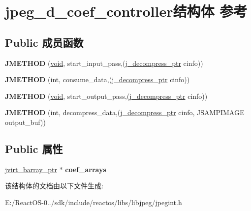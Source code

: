 \hypertarget{structjpeg__d__coef__controller}{}\section{jpeg\+\_\+d\+\_\+coef\+\_\+controller结构体 参考}
\label{structjpeg__d__coef__controller}
\subsection*{Public 成员函数}
\begin{DoxyCompactItemize}
\item 
\mbox{\label{structjpeg__d__coef__controller_ab4b18cfac761c7186363a845e36f342c}} 
{\bfseries J\+M\+E\+T\+H\+OD} (\hyperlink{interfacevoid}{void}, start\+\_\+input\+\_\+pass,(\hyperlink{structjpeg__decompress__struct}{j\+\_\+decompress\+\_\+ptr} cinfo))
\item 
\mbox{\label{structjpeg__d__coef__controller_a4c0e8d307e0852eae338a0f4f3c96edb}} 
{\bfseries J\+M\+E\+T\+H\+OD} (int, consume\+\_\+data,(\hyperlink{structjpeg__decompress__struct}{j\+\_\+decompress\+\_\+ptr} cinfo))
\item 
\mbox{\label{structjpeg__d__coef__controller_addb7a363607be97630bf37175267fd58}} 
{\bfseries J\+M\+E\+T\+H\+OD} (\hyperlink{interfacevoid}{void}, start\+\_\+output\+\_\+pass,(\hyperlink{structjpeg__decompress__struct}{j\+\_\+decompress\+\_\+ptr} cinfo))
\item 
\mbox{\label{structjpeg__d__coef__controller_a5d61ba56d9f5d8de0662df091aa6d9e1}} 
{\bfseries J\+M\+E\+T\+H\+OD} (int, decompress\+\_\+data,(\hyperlink{structjpeg__decompress__struct}{j\+\_\+decompress\+\_\+ptr} cinfo, J\+S\+A\+M\+P\+I\+M\+A\+GE output\+\_\+buf))
\end{DoxyCompactItemize}
\subsection*{Public 属性}
\begin{DoxyCompactItemize}
\item 
\mbox{\label{structjpeg__d__coef__controller_a6611f9e18fbbbb13d117caadb5d14dc1}} 
\hyperlink{structjvirt__barray__control}{jvirt\+\_\+barray\+\_\+ptr} $\ast$ {\bfseries coef\+\_\+arrays}
\end{DoxyCompactItemize}


该结构体的文档由以下文件生成\+:\begin{DoxyCompactItemize}
\item 
E\+:/\+React\+O\+S-\/0../sdk/include/reactos/libs/libjpeg/jpegint.\+h\end{DoxyCompactItemize}
